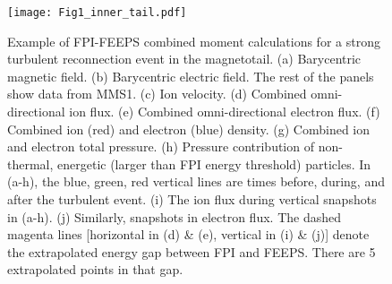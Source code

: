 \documentclass[draft]{agujournal2019}
\begin{document}
\begin{figure}
\centering
\noindent\texttt{[image: Fig1\_inner\_tail.pdf]}
\caption{
    Example of FPI-FEEPS combined moment calculations for a strong turbulent reconnection event in the magnetotail. (a) Barycentric magnetic field. (b) Barycentric electric field. The rest of the panels show data from MMS1. (c) Ion velocity. (d) Combined omni-directional ion  flux. (e) Combined omni-directional electron  flux. (f) Combined ion (red) and electron (blue) density. (g) Combined ion and electron total pressure. (h) Pressure contribution of non-thermal, energetic (larger than FPI energy threshold) particles. In (a-h), the blue, green, red vertical lines are times before, during, and after the turbulent event. (i) The ion  flux during vertical snapshots in (a-h). (j) Similarly, snapshots in electron  flux.  The dashed magenta lines [horizontal in (d) \& (e), vertical in (i) \& (j)] denote the extrapolated energy gap between FPI and FEEPS. There are 5 extrapolated points in that gap.
}
\label{fig:motivating_event}
\end{figure}
\end{document}
